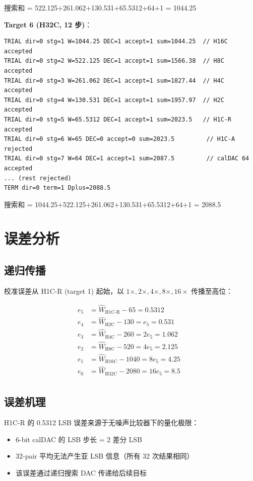 \documentclass[12pt,a4paper]{article}
\begin{document}
搜索和 = 522.125$+$261.062$+$130.531$+$65.5312$+$64$+$1 = 1044.25 \checkmark

\textbf{Target 6 (H32C, 12 步)}：
\begin{lstlisting}[basicstyle=\tiny\ttfamily]
TRIAL dir=0 stg=1 W=1044.25 DEC=1 accept=1 sum=1044.25  // H16C accepted
TRIAL dir=0 stg=2 W=522.125 DEC=1 accept=1 sum=1566.38  // H8C accepted
TRIAL dir=0 stg=3 W=261.062 DEC=1 accept=1 sum=1827.44  // H4C accepted
TRIAL dir=0 stg=4 W=130.531 DEC=1 accept=1 sum=1957.97  // H2C accepted
TRIAL dir=0 stg=5 W=65.5312 DEC=1 accept=1 sum=2023.5   // H1C-R accepted
TRIAL dir=0 stg=6 W=65 DEC=0 accept=0 sum=2023.5         // H1C-A rejected
TRIAL dir=0 stg=7 W=64 DEC=1 accept=1 sum=2087.5         // calDAC 64 accepted
... (rest rejected)
TERM dir=0 term=1 Dplus=2088.5
\end{lstlisting}

搜索和 = 1044.25$+$522.125$+$261.062$+$130.531$+$65.5312$+$64$+$1 = 2088.5 \checkmark

\section{误差分析}

\subsection{递归传播}
校准误差从 H1C-R (target 1) 起始，以 $1\times, 2\times, 4\times, 8\times, 16\times$ 传播至高位：

\begin{equation}
\begin{aligned}
e_5 &= \hat{W}_{\text{H1C-R}} - 65 = 0.5312 \\
e_4 &= \hat{W}_{\text{H2C}} - 130 = e_5 = 0.531 \\
e_3 &= \hat{W}_{\text{H4C}} - 260 = 2e_5 = 1.062 \\
e_2 &= \hat{W}_{\text{H8C}} - 520 = 4e_5 = 2.125 \\
e_1 &= \hat{W}_{\text{H16C}} - 1040 = 8e_5 = 4.25 \\
e_0 &= \hat{W}_{\text{H32C}} - 2080 = 16e_5 = 8.5 \\
\end{aligned}
\end{equation}

\subsection{误差机理}
H1C-R 的 0.5312 LSB 误差来源于无噪声比较器下的量化极限：
\begin{itemize}
  \item 6-bit calDAC 的 LSB 步长 = 2 差分 LSB
  \item 32-pair 平均无法产生亚 LSB 信息（所有 32 次结果相同）
  \item 该误差通过递归搜索 DAC 传递给后续目标
\end{itemize}
\end{document}
